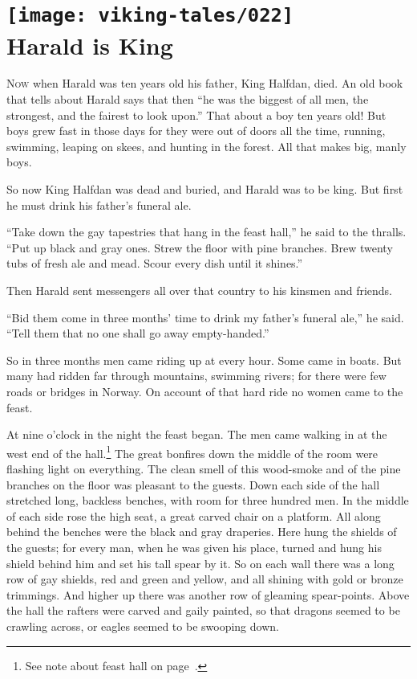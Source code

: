 \section[Harald is King]{
    \texttt{[image: viking-tales/022]}\\
    Harald is King}

\lettrine{N}{ow} when Harald was ten years old his father, King Halfdan,
died. An old book that tells about Harald says that then ``he was the
biggest of all men, the strongest, and the fairest to look upon.'' That
about a boy ten years old! But boys grew fast in those days for they were
out of doors all the time, running, swimming, leaping on skees, and
hunting in the forest. All that makes big, manly boys.

So now King Halfdan was dead and buried, and Harald was to be king. But
first he must drink his father's funeral ale.

``Take down the gay tapestries that hang in the feast hall,'' he said to
the thralls. ``Put up black and gray ones. Strew the floor with pine
branches. Brew twenty tubs of fresh ale and mead. Scour every dish until
it shines.''

Then Harald sent messengers all over that country to his kinsmen and
friends.

``Bid them come in three months' time to drink my father's funeral
ale,'' he said. ``Tell them that no one shall go away empty-handed.''

So in three months men came riding up at every hour. Some came in boats.
But many had ridden far through mountains, swimming rivers; for there
were few roads or bridges in Norway. On account of that hard ride no
women came to the feast.

At nine o'clock in the night the feast began. The men came walking in at
the west end of the hall.\footnote{See note about feast hall on
page~\pageref{feast-hall}.} The great bonfires down the middle of the
room were flashing light on everything. The clean smell of this
wood-smoke and of the pine branches on the floor was pleasant to the
guests. Down each side of the hall stretched long, backless benches, with
room for three hundred men. In the middle of each side rose the high
seat, a great carved chair on a platform. All along behind the benches
were the black and gray draperies. Here hung the shields of the guests;
for every man, when he was given his place, turned and hung his shield
behind him and set his tall spear by it. So on each wall there was a long
row of gay shields, red and green and yellow, and all shining with gold
or bronze trimmings. And higher up there was another row of gleaming
spear-points. Above the hall the rafters were carved and gaily painted,
so that dragons seemed to be crawling across, or eagles seemed to be
swooping down.

